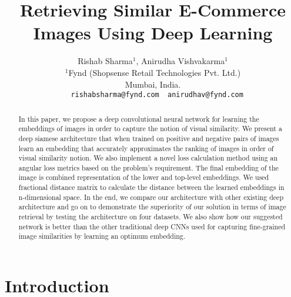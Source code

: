 \documentclass[10pt,twocolumn,letterpaper]{article}
\begin{document}
\title{\LARGE \bf
Retrieving Similar E-Commerce Images Using Deep Learning}

\author{Rishab Sharma$^{1}$,  Anirudha Vishvakarma$^{1}$\\
	$^{1}$Fynd (Shopsense Retail Technologies Pvt. Ltd.)\\ Mumbai, India.\\
	{\tt\small ~~rishabsharma@fynd.com~~anirudhav@fynd.com}\\  \vspace{-1mm}	
}
\maketitle




\begin{abstract}\vspace{-3mm}
In this paper, we propose a deep convolutional neural network for learning the embeddings of images in order to capture the notion of visual similarity. We present a deep siamese architecture that when trained on positive and negative pairs of images learn an embedding that accurately approximates the ranking of images in order of visual similarity notion. We also implement a novel loss calculation method using an angular loss metrics based on the problem’s requirement. The final embedding of the image is combined representation of the lower and top-level embeddings. We used fractional distance matrix to calculate the distance between the learned embeddings in n-dimensional space. In the end, we compare our architecture with other existing deep architecture and go on to demonstrate the superiority of our solution in terms of image retrieval by testing the architecture on four datasets. We also show how our suggested network is better than the other traditional deep CNNs used for capturing fine-grained image similarities by learning an optimum embedding.
\end{abstract}

\vspace{-4mm}
\section{Introduction}\vspace{-1mm}
\end{document}
